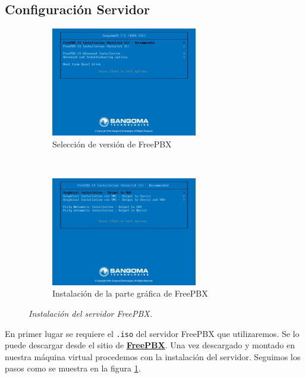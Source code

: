 \documentclass[conference]{IEEEtran}
\begin{document}
\subsection{Configuración Servidor}
\begin{figure}[h]
    \begin{subfigure}[h]{0.5\textwidth}
       \centerline{\includegraphics[width=0.7\textwidth]{img/1.jpeg}}
        \caption{Selección de versión de FreePBX}

    \end{subfigure}
    ~ %
     \begin{subfigure}[h]{0.5\textwidth}
        \centerline{\includegraphics[width=0.7\textwidth]{img/2.jpeg}}
        \caption{Instalación de la parte gráfica de FreePBX}

    \end{subfigure}
    \caption{\textit{Instalación del servidor FreePBX.}}
\label{fig:mets0}
\end{figure}
En primer lugar se requiere el \texttt{.iso} del servidor FreePBX que utilizaremos. Se lo puede descargar desde el sitio de \href{https://www.freepbx.org/downloads/freepbx-distro/}{{\textbf{FreePBX}}}. Una vez descargado y montado en nuestra máquina virtual procedemos con la instalación del servidor. Seguimos los pasos como se muestra en la figura \ref{fig:mets0}.\\
\end{document}
